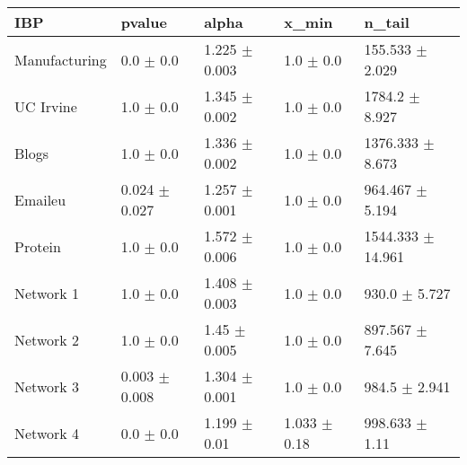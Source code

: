 \begin{tabular}{@{}lllll@{}}
\toprule

\textbf{IBP} & pvalue & alpha & x\_min & n\_tail \\\midrule

Manufacturing & 0.0 \(\pm\) 0.0 & 1.225 \(\pm\) 0.003 & 1.0 \(\pm\)
0.0 & 155.533 \(\pm\) 2.029 \\
UC Irvine & 1.0 \(\pm\) 0.0 & 1.345 \(\pm\) 0.002 & 1.0 \(\pm\)
0.0 & 1784.2 \(\pm\) 8.927 \\
Blogs & 1.0 \(\pm\) 0.0 & 1.336 \(\pm\) 0.002 & 1.0 \(\pm\)
0.0 & 1376.333 \(\pm\) 8.673 \\
Emaileu & 0.024 \(\pm\) 0.027 & 1.257 \(\pm\) 0.001 & 1.0 \(\pm\)
0.0 & 964.467 \(\pm\) 5.194 \\
Protein & 1.0 \(\pm\) 0.0 & 1.572 \(\pm\) 0.006 & 1.0 \(\pm\)
0.0 & 1544.333 \(\pm\) 14.961 \\
Network 1 & 1.0 \(\pm\) 0.0 & 1.408 \(\pm\) 0.003 & 1.0 \(\pm\)
0.0 & 930.0 \(\pm\) 5.727 \\
Network 2 & 1.0 \(\pm\) 0.0 & 1.45 \(\pm\) 0.005 & 1.0 \(\pm\)
0.0 & 897.567 \(\pm\) 7.645 \\
Network 3 & 0.003 \(\pm\) 0.008 & 1.304 \(\pm\) 0.001 & 1.0 \(\pm\)
0.0 & 984.5 \(\pm\) 2.941 \\
Network 4 & 0.0 \(\pm\) 0.0 & 1.199 \(\pm\) 0.01 & 1.033 \(\pm\)
0.18 & 998.633 \(\pm\) 1.11 \\

\bottomrule
\end{tabular}
